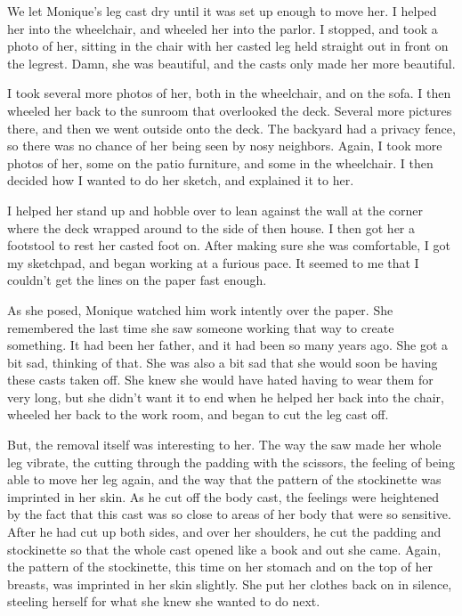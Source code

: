 We let Monique's leg cast dry until it was set up enough to move her. I helped her into the
wheelchair, and wheeled her into the parlor. I stopped, and took a photo of her, sitting in the
chair with her casted leg held straight out in front on the legrest. Damn, she was beautiful,
and the casts only made her more beautiful.

I took several more photos of her, both in the wheelchair, and on the sofa. I then wheeled
her back to the sunroom that overlooked the deck. Several more pictures there, and then we went
outside onto the deck. The backyard had a privacy fence, so there was no chance of her being
seen by nosy neighbors. Again, I took more photos of her, some on the patio furniture, and some
in the wheelchair. I then decided how I wanted to do her sketch, and explained it to her.

I helped her stand up and hobble over to lean against the wall at the corner where the deck
wrapped around to the side of then house. I then got her a footstool to rest her casted foot on.
After making sure she was comfortable, I got my sketchpad, and began working at a furious pace.
It seemed to me that I couldn't get the lines on the paper fast enough.

\begin{thought}
As she posed, Monique watched him work intently over the paper. She remembered the last time
she saw someone working that way to create something. It had been her father, and it had been so
many years ago. She got a bit sad, thinking of that. She was also a bit sad that she would soon
be having these casts taken off. She knew she would have hated having to wear them for very
long, but she didn't want it to end when he helped her back into the chair, wheeled her back to
the work room, and began to cut the leg cast off.

But, the removal itself was interesting to her. The way the saw made her whole leg vibrate,
the cutting through the padding with the scissors, the feeling of being able to move her leg
again, and the way that the pattern of the stockinette was imprinted in her skin. As he cut off
the body cast, the feelings were heightened by the fact that this cast was so close to areas of
her body that were so sensitive. After he had cut up both sides, and over her shoulders, he cut
the padding and stockinette so that the whole cast opened like a book and out she came. Again,
the pattern of the stockinette, this time on her stomach and on the top of her breasts, was
imprinted in her skin slightly. She put her clothes back on in silence, steeling herself for
what she knew she wanted to do next.
\end{thought}

